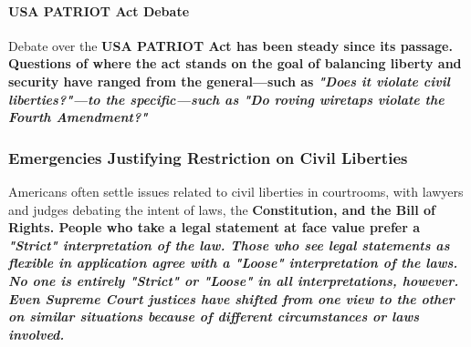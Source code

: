 \paragraph{USA PATRIOT Act Debate} Debate over the \bf{USA PATRIOT Act} has been steady since its passage. Questions of where the act stands on the goal of balancing liberty and security have ranged from the general—such as \it{"Does it violate civil liberties?"}—to the specific—such as \it{"Do roving wiretaps violate the Fourth Amendment?"}

\subsubsection*{Emergencies Justifying Restriction on Civil Liberties}

Americans often settle issues related to civil liberties in courtrooms, with lawyers and judges debating the intent of laws, the \bf{Constitution}, and the \bf{Bill of Rights}. People who take a legal statement at face value prefer a \it{"Strict"} interpretation of the law. Those who see legal statements as flexible in application agree with a \it{"Loose"} interpretation of the laws. No one is entirely \it{"Strict"} or \it{"Loose"} in all interpretations, however. Even \bf{Supreme Court} justices have shifted from one view to the other on similar situations because of different circumstances or laws involved.

\newpage
